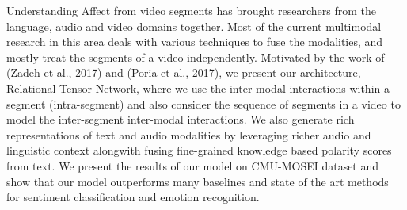 Understanding Affect from video segments has brought researchers from the language, audio and video domains together. Most of the current multimodal research in this area deals with various techniques to fuse the modalities, and mostly treat the segments of a video independently. Motivated by the work of (Zadeh et al., 2017) and (Poria et al., 2017), we present our architecture, Relational Tensor Network, where we use the inter-modal interactions within a segment (intra-segment) and also consider the sequence of segments in a video to model the inter-segment inter-modal interactions. We also generate rich representations of text and audio modalities by leveraging richer audio and linguistic context alongwith fusing fine-grained knowledge based polarity scores from text. We present the results of our model on CMU-MOSEI dataset and show that our model outperforms many baselines and state of the art methods for sentiment classification and emotion recognition.
